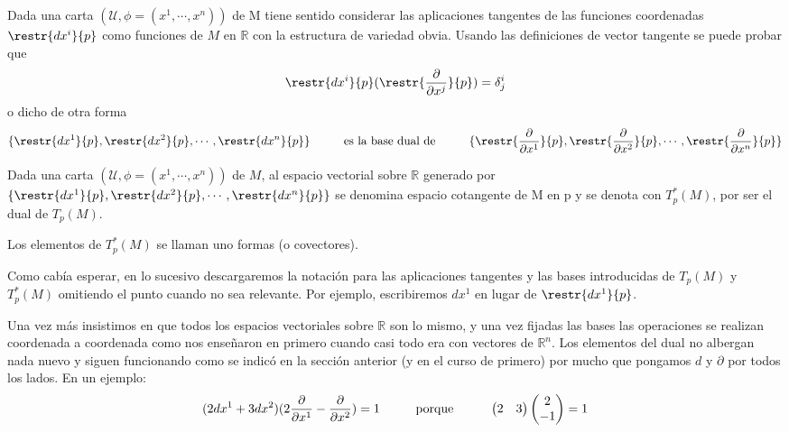 \documentclass[palatino, bibnumbers]{apuntes}
\begin{document}
Dada una carta $(\mathcal{U},\phi=(x^1,\cdots,x^n))$ de M tiene sentido considerar las aplicaciones tangentes de las funciones coordenadas $\restr{dx^{i}}{p}$ como funciones de $M$ en $ℝ$ con la estructura de variedad obvia. Usando las definiciones de vector tangente se puede probar que $$\restr{dx^{i}}{p}(\restr{\pdv{}{x^j}}{p})=\delta_j^i$$ o dicho de otra forma $$\{\restr{dx^1}{p},\restr{dx^2}{p},\cdots,\restr{dx^n}{p}\}\tab \text{es la base dual de} \tab\{\restr{\pdv{}{x^1}}{p},\restr{\pdv{}{x^2}}{p},\cdots,\restr{\pdv{}{x^n}}{p}\}$$

\begin{defn} Dada una carta $(\mathcal{U},\phi=(x^1,\cdots,x^n))$ de $M$, al espacio vectorial sobre $ℝ$ generado por $\{\restr{dx^1}{p},\restr{dx^2}{p},\cdots,\restr{dx^n}{p}\}$ se denomina espacio cotangente de M en p y se denota con $T_p^{*}(M)$, por ser el dual de $T_p(M)$.
\end{defn}

\begin{defn} Los elementos de $T_p^{*}(M)$ se llaman uno formas (o covectores).
\end{defn}

Como cabía esperar, en lo sucesivo descargaremos la notación para las aplicaciones tangentes y las bases introducidas de $T_p(M)$ y $T_p^{*}(M)$ omitiendo el punto cuando no sea relevante. Por ejemplo, escribiremos $dx^1$ en lugar de $\restr{dx^1}{p}$.

Una vez más insistimos en que todos los espacios vectoriales sobre $ℝ$ son lo mismo, y una vez fijadas las bases las operaciones se realizan coordenada a coordenada como nos enseñaron en primero cuando casi todo era con vectores de $ℝ^{n}$. Los elementos del dual no albergan nada nuevo y siguen funcionando como se indicó en la sección anterior (y en el curso de primero) por mucho que pongamos $d$ y $\partial$ por todos los lados. En un ejemplo: \\ $$(2dx^1+3dx^2)(2\pdv{}{x^1}-\pdv{}{x^2})=1 \hspace*{1cm}\text{porque}\hspace*{1cm} \begin{pmatrix}2&3\end{pmatrix}\begin{pmatrix}2\\-1\end{pmatrix}=1$$
\newpage
\end{document}
